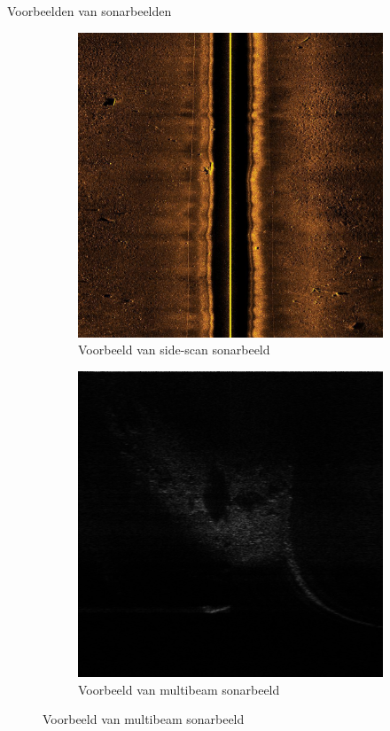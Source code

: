 \documentclass[aspectratio=169]{beamer}
\begin{document}
    \begin{frame}{Voorbeelden van sonarbeelden}
        \begin{figure}
            \centering
            \begin{subfigure}{.5\textwidth}
                \centering
                \captionsetup{justification=centering}
                \includegraphics[width=0.9\linewidth]{SSSFMD_example.jpg}
                \caption{Voorbeeld van side-scan sonarbeeld}
            \end{subfigure}%
            \hfill
            \begin{subfigure}{.5\textwidth}
                \centering
                \captionsetup{justification=centering}
                \includegraphics[width=0.9\linewidth]{UATD_example.png}
                \caption{Voorbeeld van multibeam sonarbeeld}
            \end{subfigure}%
        \end{figure}
    \end{frame}
    
\end{document}
